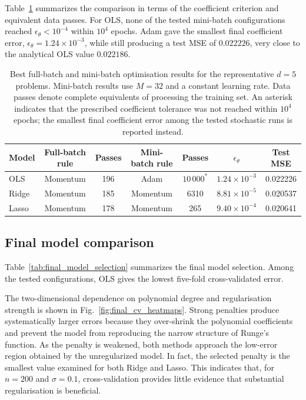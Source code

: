 \documentclass[aps,rmp,reprint,amsmath,amssymb,graphicx,longbibliography]{revtex4-1}
\begin{document}
Table~\ref{tab:sgd_best} summarizes the comparison in terms of the coefficient
criterion and equivalent data passes. For OLS, none of the tested mini-batch configurations reached $\epsilon_\theta<10^{-4}$ within $10^4$ epochs. Adam gave the smallest final coefficient error, $\epsilon_\theta=1.24\times10^{-3}$, while still producing a test MSE of $0.022226$, very close to the analytical OLS value
$0.022186$.

\begin{table}[t]
\centering
\caption{Best full-batch and mini-batch optimisation results for the
representative $d=5$ problems. Mini-batch results use $M=32$ and a constant
learning rate. Data passes denote complete equivalents of processing the
training set. An asterisk indicates that the prescribed coefficient
tolerance was not reached within $10^4$ epochs; the smallest final
coefficient error among the tested stochastic runs is reported instead.}
\label{tab:sgd_best}
\begin{tabular}{lcccccc}
\hline
Model &
Full-batch rule &
Passes &
Mini-batch rule &
Passes &
$\epsilon_\theta$ &
Test MSE \\
\hline
OLS
& Momentum & 196
& Adam & $10\,000^{*}$
& $1.24\times10^{-3}$
& 0.022226 \\

Ridge
& Momentum & 185
& Momentum & 6310
& $8.81\times10^{-5}$
& 0.020537 \\

Lasso
& Momentum & 178
& Momentum & 265
& $9.40\times10^{-4}$
& 0.020641 \\
\hline
\end{tabular}
\end{table}

\subsection{Final model comparison}

Table~\ref{tab:final_model_selection} summarizes the final model selection.
Among the tested configurations, OLS gives the lowest five-fold cross-validated error.

The two-dimensional dependence on polynomial degree and regularisation
strength is shown in Fig.~\ref{fig:final_cv_heatmaps}. Strong penalties
produce systematically larger errors because they over-shrink the polynomial
coefficients and prevent the model from reproducing the narrow structure of
Runge's function. As the penalty is weakened, both methods approach the
low-error region obtained by the unregularized model. In fact, the selected
penalty is the smallest value examined for both Ridge and Lasso. This
indicates that, for $n=200$ and $\sigma=0.1$, cross-validation provides
little evidence that substantial regularisation is beneficial.
\end{document}

